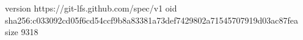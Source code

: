 version https://git-lfs.github.com/spec/v1
oid sha256:c033092cd05f6cd54ccf9b8a83381a73def7429802a71545707919d03ac87fea
size 9318
